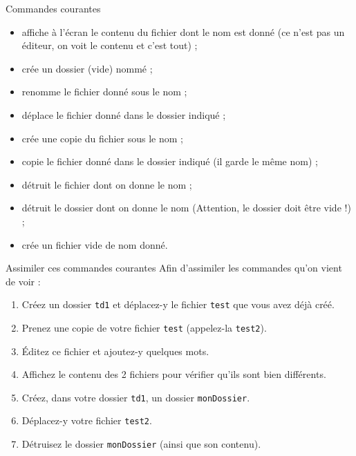 \documentclass[a4paper,11pt]{style-esi/td}
\begin{document}
	\begin{theorie}{Commandes courantes}
		\begin{itemize}
		\item {}
			affiche à l'écran le contenu du fichier dont le nom est donné 
			(ce n'est pas un éditeur, on voit le contenu et c'est tout) ;
		\item {}
			crée un dossier (vide) nommé  ;
		\item {} 
			renomme le fichier donné  sous le nom  ;
		\item {}
			déplace le fichier donné dans le dossier indiqué ;
		\item {} 
			crée une copie du fichier sous le nom  ;
		\item {} copie le fichier donné dans le dossier indiqué 
			(il garde le même nom) ;
		\item {} détruit le fichier dont on donne le nom ;
		\item {} détruit le dossier dont on donne le nom 
			(Attention, le dossier doit être vide !) ;
		\item {} crée un fichier vide de nom donné.
		\end{itemize}
	\end{theorie}

	\begin{Exercice}{Assimiler ces commandes courantes}
		Afin d'assimiler les commandes qu'on vient de voir :
		\begin{enumerate}
		\item Créez un dossier \verb_td1_ et déplacez-y le fichier \verb_test_ 
			que vous avez déjà créé.
		\item Prenez une copie de votre fichier \verb_test_ (appelez-la \verb_test2_).
		\item Éditez ce fichier et ajoutez-y quelques mots.
		\item Affichez le contenu des 2 fichiers pour vérifier qu'ils sont bien différents.
		\item Créez, dans votre dossier \verb_td1_, un dossier \verb_monDossier_.
		\item Déplacez-y votre fichier \verb_test2_.
		\item Détruisez le dossier \verb_monDossier_ (ainsi que son contenu).
		\end{enumerate}
	\end{Exercice}
\end{document}
